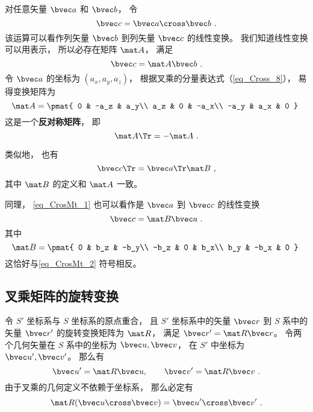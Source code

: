 
对任意矢量 $\bvec a$ 和 $\bvec b$， 令
\begin{equation}\label{eq_CrosMt_1}
\bvec c = \bvec a \cross \bvec b~.
\end{equation}
该运算可以看作列矢量 $\bvec b$ 到列矢量 $\bvec c$ 的线性变换。 我们知道线性变换可以用表示， 所以必存在矩阵 $\mat A$， 满足
\begin{equation}\label{eq_CrosMt_3}
\bvec c = \mat A \bvec b~.
\end{equation}
令 $\bvec a$ 的坐标为 $(a_x, a_y, a_z)$， 根据叉乘的分量表达式（\autoref{eq_Cross_8}）， 易得变换矩阵为
\begin{equation}\label{eq_CrosMt_2}
\mat A = \pmat{
0 & -a_z & a_y\\
a_z & 0 & -a_x\\
-a_y & a_x & 0
}~\end{equation}
这是一个\textbf{反对称矩阵}， 即
\begin{equation}
\mat A\Tr = -\mat A~.
\end{equation}

类似地， 也有
\begin{equation}
\bvec c\Tr = \bvec a\Tr \mat B~,
\end{equation}
其中 $\mat B$ 的定义和 $\mat A$ 一致。

同理， \autoref{eq_CrosMt_1} 也可以看作是 $\bvec a$ 到 $\bvec c$ 的线性变换
\begin{equation}
\bvec c = \mat B \bvec a~.
\end{equation}
其中
\begin{equation}
\mat B = \pmat{
0 & b_z & -b_y\\
-b_z & 0 & b_x\\
b_y & -b_x & 0
}~
\end{equation}
这恰好与\autoref{eq_CrosMt_2} 符号相反。

\subsection{叉乘矩阵的旋转变换}\label{sub_CrosMt_1}
令 $S'$ 坐标系与 $S$ 坐标系的原点重合， 且 $S'$ 坐标系中的矢量 $\bvec r$ 到 $S$ 系中的矢量 $\bvec r'$ 的旋转变换矩阵为 $\mat R$， 满足 $\bvec r' = \mat R\bvec r$。 令两个几何矢量在 $S$ 系中的坐标为 $\bvec u, \bvec v$， 在 $S'$ 中坐标为 $\bvec u', \bvec v'$。 那么有
\begin{equation}
\bvec u' = \mat R\bvec u, \qquad
\bvec v' = \mat R\bvec v~.
\end{equation}
由于叉乘的几何定义不依赖于坐标系， 那么必定有
\begin{equation}
\mat R(\bvec u\cross \bvec v) = \bvec u'\cross \bvec v'~.
\end{equation}


